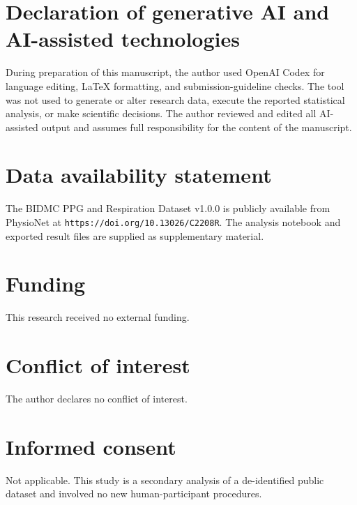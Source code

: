 \documentclass{elektr}
\begin{document}
\section*{Declaration of generative AI and AI-assisted technologies}

During preparation of this manuscript, the author used OpenAI Codex for
language editing, \LaTeX{} formatting, and submission-guideline checks. The
tool was not used to generate or alter research data, execute the reported
statistical analysis, or make scientific decisions. The author reviewed and
edited all AI-assisted output and assumes full responsibility for the content
of the manuscript.


\section*{Data availability statement}

The BIDMC PPG and Respiration Dataset v1.0.0 is publicly available from PhysioNet at \texttt{https://doi.org/10.13026/C2208R}. The analysis notebook and exported result files are supplied as supplementary material.

\section*{Funding}

This research received no external funding.

\section*{Conflict of interest}

The author declares no conflict of interest.

\section*{Informed consent}

Not applicable. This study is a secondary analysis of a de-identified public dataset and involved no new human-participant procedures.
\end{document}

